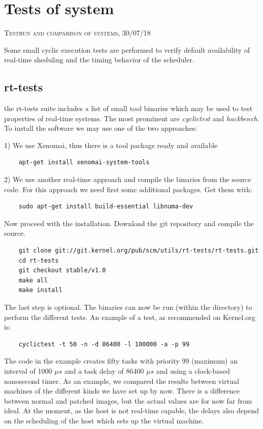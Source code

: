 \documentclass[]{scrartcl}
\begin{document}
\section{Tests of system}

{\small\textsc{Testrun and comparison of systems, 30/07/18} \bigskip}

Some small cyclic execution tests are performed to verify default availability of real-time sheduling and the timing behavior of the scheduler.

\subsection{rt-tests}

the rt-tests suite includes a list of small tool binaries which may be used to test properties of real-time systems. The most prominent are \textit{cyclictest} and \textit{hackbench}. To install the software we may use one of the two approaches:

1) We use Xenomai, thus there is a tool package ready and available

\begin{verbatim}
	apt-get install xenomai-system-tools
\end{verbatim}

2) We use another real-time approach and compile the binaries from the source code.
For this approach we need first some additional packages. Get them with:

\begin{verbatim}
	sudo apt-get install build-essential libnuma-dev
\end{verbatim}

Now proceed with the installation. Download the git repository and compile the source.

\begin{verbatim}
	git clone git://git.kernel.org/pub/scm/utils/rt-tests/rt-tests.git
	cd rt-tests
	git checkout stable/v1.0
	make all
	make install
\end{verbatim}

The last step is optional. The binaries can now be run (within the directory) to perform the different tests. An example of a test, as recommended on Kernel.org is: 

\begin{verbatim}
	cyclictest -t 50 -n -d 86400 -l 100000 -a -p 99
\end{verbatim}

The code in the example creates fifty tasks with priority 99 (maximum) an interval of 1000 $\mu s$ and a task delay of 86400 $\mu s$ and using a clock-based nanosecond timer. 
As an example, we compared the results between virtual machines of the different kinds we have set up by now. There is a difference between normal and patched images, but the actual values are for now far from ideal. At the moment, as the host is not real-time capable, the delays also depend on the scheduling of the host which sets up the virtual machine. 
\end{document}
